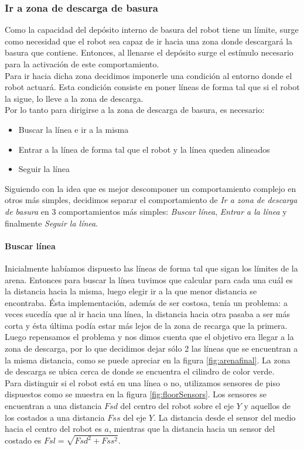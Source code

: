 \subsubsection{Ir a zona de descarga de basura}
\label{go_to_unload_zone}
Como la capacidad del dep\'osito interno de basura del robot tiene un l\'imite, 
surge como necesidad que el robot sea capaz de ir hacia una zona donde
descargar\'a la basura que contiene. Entonces, al llenarse el dep\'osito
surge el est\'imulo necesario para la activaci\'on de este comportamiento.
\\\indent
Para ir hacia dicha zona decidimos imponerle una condici\'on al
entorno donde el robot actuar\'a. Esta condici\'on consiste en poner l\'ineas
de forma tal que si el robot la sigue, lo lleve a la zona de descarga.
\\\indent
Por lo tanto para dirigirse a la zona de descarga de basura, es necesario:
\begin{itemize}
	\item Buscar la l\'inea e ir a la misma
	\item Entrar a la l\'inea de forma tal que el robot y la l\'inea queden
				alineados
	\item Seguir la l\'inea
\end{itemize}
Siguiendo con la idea que es mejor descomponer un comportamiento complejo en
otros m\'as simples, decidimos separar el comportamiento de \emph{Ir a zona de
descarga de basura} en 3 comportamientos m\'as simples: \emph{Buscar l\'inea},
\emph{Entrar a la l\'inea} y finalmente \emph{Seguir la l\'inea}.

\paragraph{Buscar l\'inea}
\label{find_line}
Inicialmente hab\'iamos dispuesto las l\'ineas de forma tal que sigan los
l\'imites de la arena. Entonces para buscar la l\'inea tuvimos que calcular
para cada una cu\'al es la distancia hacia la misma, luego elegir ir a la
que menor distancia se encontraba. \'Esta implementaci\'on, adem\'as de ser
costosa, ten\'ia un problema: a veces suced\'ia que al ir hacia una l\'inea,
la distancia hacia otra pasaba a ser m\'as corta y \'esta \'ultima pod\'ia
estar m\'as lejos de la zona de recarga que la primera.
\\\indent
Luego repensamos el problema y nos dimos cuenta que el objetivo era llegar a la
zona de descarga, por lo que decidimos dejar s\'olo 2 las l\'ineas que se
encuentran a la misma distancia, como se puede apreciar en la figura
\ref{fig:arenafinal}. La zona de descarga se ubica cerca de donde se encuentra
el cilindro de color verde.
\\\indent
Para distinguir si el robot est\'a en una l\'inea o no, utilizamos sensores de
piso dispuestos como se muestra en la figura \ref{fig:floorSensors}. Los
sensores se encuentran a una distancia $Fsd$ del centro del robot sobre el eje
$Y$ y aquellos de los costados a una distancia $Fss$ del eje $Y$. La distancia
desde el sensor del medio hacia el centro del robot es $a$, mientras que la
distancia hacia un sensor del costado es $Fsl = \sqrt{Fsd^2 + Fss^2}$.


